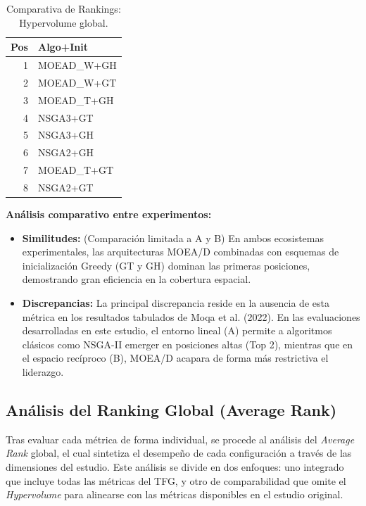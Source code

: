 \documentclass[a4paper,10pt]{article}
\begin{document}
\begin{table}[H]
\begin{minipage}[t]{0.32\textwidth}
\begin{tabular}{rl}
            \toprule
            Pos & Algo+Init \\ \midrule
            1 & MOEAD\_W+GH \\
            2 & MOEAD\_W+GT \\
            3 & MOEAD\_T+GH \\
            4 & NSGA3+GT \\
            5 & NSGA3+GH \\
            6 & NSGA2+GH \\
            7 & MOEAD\_T+GT \\
            8 & NSGA2+GT \\
            \bottomrule
        \end{tabular}
    \end{minipage}
    \caption{Comparativa de Rankings: Hypervolume global.}
\end{table}

\textbf{Análisis comparativo entre experimentos:}
\begin{itemize}
    \item \textbf{Similitudes:} (Comparación limitada a A y B) En ambos ecosistemas experimentales, las arquitecturas MOEA/D combinadas con esquemas de inicialización Greedy (GT y GH) dominan las primeras posiciones, demostrando gran eficiencia en la cobertura espacial.
    \item \textbf{Discrepancias:} La principal discrepancia reside en la ausencia de esta métrica en los resultados tabulados de Moqa et al. (2022). En las evaluaciones desarrolladas en este estudio, el entorno lineal (A) permite a algoritmos clásicos como NSGA-II emerger en posiciones altas (Top 2), mientras que en el espacio recíproco (B), MOEA/D acapara de forma más restrictiva el liderazgo.
\end{itemize}

\subsection{Análisis del Ranking Global (Average Rank)}

Tras evaluar cada métrica de forma individual, se procede al análisis del \textit{Average Rank} global, el cual sintetiza el desempeño de cada configuración a través de las dimensiones del estudio. Este análisis se divide en dos enfoques: uno integrado que incluye todas las métricas del TFG, y otro de comparabilidad que omite el \textit{Hypervolume} para alinearse con las métricas disponibles en el estudio original.
\end{document}
